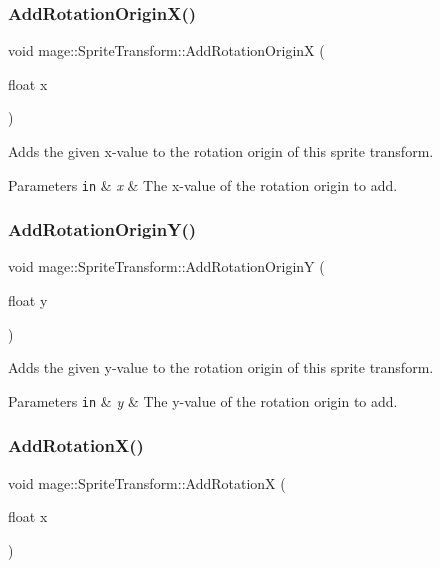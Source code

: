 \subsubsection{\texorpdfstring{Add\+Rotation\+Origin\+X()}{AddRotationOriginX()}}
{\footnotesize\ttfamily void mage\+::\+Sprite\+Transform\+::\+Add\+Rotation\+OriginX (\begin{DoxyParamCaption}\item[{float}]{x }\end{DoxyParamCaption})}

Adds the given x-\/value to the rotation origin of this sprite transform.


\begin{DoxyParams}[1]{Parameters}
\mbox{\tt in}  & {\em x} & The x-\/value of the rotation origin to add. \\
\hline
\end{DoxyParams}
\hypertarget{structmage_1_1_sprite_transform_a47808a3521d3c083b3fd0203fbd21b5c}{}\label{structmage_1_1_sprite_transform_a47808a3521d3c083b3fd0203fbd21b5c} 
\subsubsection{\texorpdfstring{Add\+Rotation\+Origin\+Y()}{AddRotationOriginY()}}
{\footnotesize\ttfamily void mage\+::\+Sprite\+Transform\+::\+Add\+Rotation\+OriginY (\begin{DoxyParamCaption}\item[{float}]{y }\end{DoxyParamCaption})}

Adds the given y-\/value to the rotation origin of this sprite transform.


\begin{DoxyParams}[1]{Parameters}
\mbox{\tt in}  & {\em y} & The y-\/value of the rotation origin to add. \\
\hline
\end{DoxyParams}
\hypertarget{structmage_1_1_sprite_transform_ae03fd1cfaca1a48d7b98c0213cf6a0a1}{}\label{structmage_1_1_sprite_transform_ae03fd1cfaca1a48d7b98c0213cf6a0a1} 
\subsubsection{\texorpdfstring{Add\+Rotation\+X()}{AddRotationX()}}
{\footnotesize\ttfamily void mage\+::\+Sprite\+Transform\+::\+Add\+RotationX (\begin{DoxyParamCaption}\item[{float}]{x }\end{DoxyParamCaption})}

